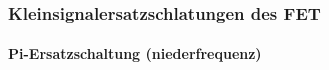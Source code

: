 

\subsubsection{Kleinsignalersatzschlatungen des FET}

\paragraph{Pi-Ersatzschaltung (niederfrequenz)}

